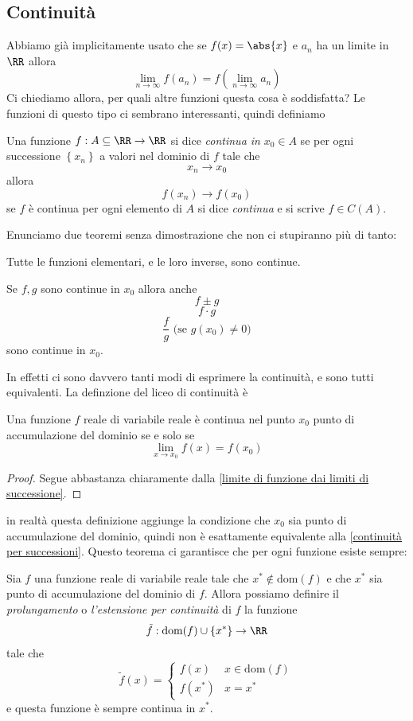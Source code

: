 \documentclass[11pt]{scrartcl}
\begin{document}
	\subsection{Continuità}
	Abbiamo già implicitamente usato che se $f(x)=\abs{x}$ e $a_n$ ha un limite in $\RR$ allora
	$$\lim_{n\to \infty}f(a_n)=f\left(\lim_{n\to\infty} a_n\right)$$
	Ci chiediamo allora, per quali altre funzioni questa cosa è soddisfatta? Le funzioni di questo tipo ci sembrano interessanti, quindi definiamo
	\begin{definition}[Continuità]\label{continuità per successioni}
		Una funzione $f:A\subseteq\RR\to\RR$ si dice \textit{continua in} $x_0\in A$ se per ogni successione $\left\{x_n\right\}$ a valori nel dominio di $f$ tale che 
		$$x_n\to x_0$$
		allora 
		$$f(x_n)\to f(x_0)$$
		se $f$ è continua per ogni elemento di $A$ si dice \textit{continua} e si scrive $f\in C(A)$.
	\end{definition}
	Enunciamo due teoremi senza dimostrazione che non ci stupiranno più di tanto:
	\begin{theorem}
		Tutte le funzioni elementari, e le loro inverse, sono continue.
	\end{theorem}
	\begin{theorem}
		Se $f,g$ sono continue in $x_0$ allora anche 
		$$f\pm g$$
		$$f\cdot g$$
		$$\frac{f}{g} \text{  (se $g(x_0)\ne 0$)}$$
		sono continue in $x_0$.
	\end{theorem}
	In effetti ci sono davvero tanti modi di esprimere la continuità, e sono tutti equivalenti. La definzione del liceo di continuità è 
	\begin{proposition}
		Una funzione $f$ reale di variabile reale è continua nel punto $x_0$ punto di accumulazione del dominio se e solo se
		$$\lim_{x\to x_0}f(x)=f(x_0)$$
	\end{proposition}
	\begin{proof}
		Segue abbastanza chiaramente dalla \ref{limite di funzione dai limiti di successione}.
	\end{proof}
	in realtà questa definizione aggiunge la condizione che $x_0$ sia punto di accumulazione del dominio, quindi non è esattamente equivalente alla \ref{continuità per successioni}. Questo teorema ci garantisce che per ogni funzione esiste sempre:
	\begin{definition}[Prolungamento di $f$]
		Sia $f$ una funzione reale di variabile reale tale che $x^*\not\in\text{dom}(f)$ e che $x^*$ sia punto di accumulazione del dominio di $f$. Allora possiamo definire il \textit{prolungamento} o \textit{l'estensione per continuità} di $f$ la funzione 
		$$\tilde{f}:\text{dom}(f)\cup \left\{x^*\right\}\to\RR$$
		tale che
		$$\tilde{f}(x)=
		\begin{cases}
			f(x) & x\in \text{dom}(f) \\
			f(x^*) & x=x^*
		\end{cases}
		$$ 
		e questa funzione è sempre continua in $x^*$.
	\end{definition}
	
\end{document}
